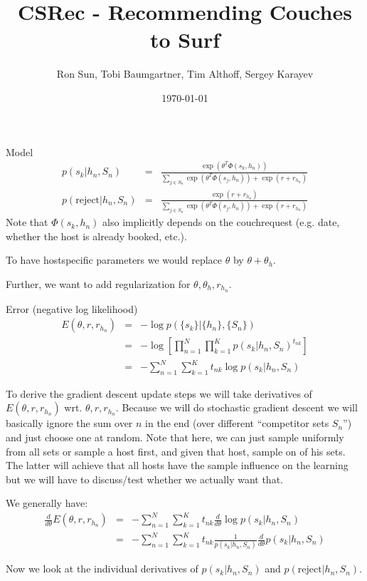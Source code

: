 \documentclass[10pt]{article}
\title{CSRec - Recommending Couches to Surf}
\author{Ron Sun, Tobi Baumgartner, Tim Althoff, Sergey Karayev}
\date{\today}
\begin{document}
\maketitle
Model
\begin{eqnarray}
p(s_k | h_n, S_n) &=& \frac{\exp(\theta^T \Phi(s_k,h_n))}{\sum_{j \in S_n} \exp(\theta^T \Phi(s_j,h_n)) + \exp(r + r_{h_n})} \\
p(\text{reject} | h_n, S_n) &=& \frac{\exp(r+r_{h_n})}{\sum_{j \in S_n} \exp(\theta^T \Phi(s_j,h_n)) + \exp(r + r_{h_n})}
\end{eqnarray}
Note that $\Phi(s_k,h_n)$ also implicitly depends on the couchrequest (e.g. date, whether the host is already booked, etc.).

To have hostspecific parameters we would replace $\theta$ by $\theta + \theta_h$. 

Further, we want to add regularization for $\theta, \theta_h, r_{h_n}$.

Error (negative log likelihood)
\begin{eqnarray}
E(\theta, r, r_{h_n}) &=& - \log p(\{s_k\} | \{h_n\}, \{S_n\})\\
&=& - \log [ \prod_{n=1}^N \prod_{k=1}^K p(s_k | h_n, S_n)^{t_{nk}}]\\
&=&  - \sum_{n=1}^N \sum_{k=1}^K t_{nk} \log p(s_k | h_n, S_n)
\end{eqnarray}

To derive the gradient descent update steps we will take derivatives of $E(\theta, r, r_{h_n})$ wrt. $\theta, r, r_{h_n}$. Because we will do stochastic gradient descent we will basically ignore the sum over $n$ in the end (over different ``competitor sets $S_n$'') and just choose one at random. Note that here, we can just sample uniformly from all sets or sample a host first, and given that host, sample on of his sets. The latter will achieve that all hosts have the sample influence on the learning but we will have to discuss/test whether we actually want that.

We generally have:
\begin{eqnarray}
\frac{d}{d \theta} E(\theta, r, r_{h_n}) &=& - \sum_{n=1}^N \sum_{k=1}^K t_{nk} \frac{d}{d \theta}  \log p(s_k | h_n, S_n) \\
&=& - \sum_{n=1}^N \sum_{k=1}^K t_{nk} \frac{1}{p(s_k | h_n, S_n)} \frac{d}{d \theta} p(s_k | h_n, S_n)
\end{eqnarray}

Now we look at the individual derivatives of $p(s_k | h_n, S_n)$ and $p(\text{reject} | h_n, S_n)$.
\end{document}
